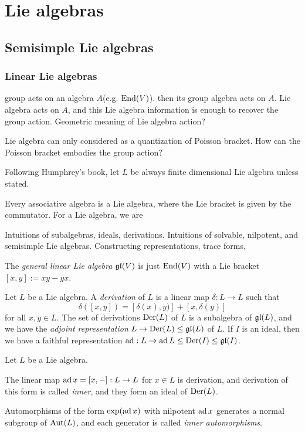 \documentclass{../../large}
\begin{document}
\part{Lie algebras}
\chapter{Semisimple Lie algebras}
\section{Linear Lie algebras}

group acts on an algebra $A$(e.g. $\operatorname{End}(V)$).
then its group algebra acts on $A$.
Lie algebra acts on $A$, and this Lie algebra information is enough to recover the group action.
Geometric meaning of Lie algebra action?

Lie algebra can only considered as a quantization of Poisson bracket.
How can the Poisson bracket embodies the group action?






Following Humphrey's book, let $L$ be always finite dimensional Lie algebra unless stated.

\begin{prb}
Every associative algebra is a Lie algebra, where the Lie bracket is given by the commutator.
For a Lie algebra, we are 

Intuitions of subalgebras, ideals, derivations.
Intuitions of solvable, nilpotent, and semisimple Lie algebras.
Constructing representations, trace forms,

The \emph{general linear Lie algebra} $\mathfrak{gl}(V)$ is just $\operatorname{End}(V)$ with a Lie bracket $[x,y]:=xy-yx$.
\end{prb}

\begin{prb}[Derivations]
Let $L$ be a Lie algebra.
A \emph{derivation} of $L$ is a linear map $\delta:L\to L$ such that \[\delta([x,y])=[\delta(x),y)]+[x,\delta(y)]\]
for all $x,y\in L$.
The set of derivations $\operatorname{Der}(L)$ of $L$ is a subalgebra of $\mathfrak{gl}(L)$, and we have the \emph{adjoint representation} $L\to\operatorname{Der}(L)\le\mathfrak{gl}(L)$ of $L$.
If $I$ is an ideal, then we have a faithful representation $\operatorname{ad}:L\to\operatorname{ad} L\le\operatorname{Der}(I)\le\mathfrak{gl}(I)$.
\end{prb}

\begin{prb}
Let $L$ be a Lie algebra.

The linear map $\operatorname{ad} x=[x,-]:L\to L$ for $x\in L$ is derivation, and derivation of this form is called \emph{inner}, and they form an ideal of $\operatorname{Der}(L)$.

Automorphisms of the form $\exp(\operatorname{ad} x)$ with nilpotent $\operatorname{ad} x$ generates a normal subgroup of $\operatorname{Aut}(L)$, and each generator is called \emph{inner automorphisms}.
\end{prb}
\end{document}
